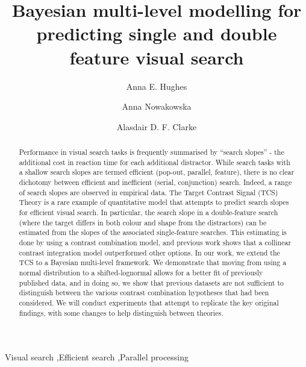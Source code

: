 \documentclass[preprint,12pt,authoryear]{elsarticle}
\begin{document}
\begin{frontmatter}

\title{Bayesian multi-level modelling for predicting single and double feature visual search}

\author[inst1]{Anna E. Hughes}
\author[2]{Anna Nowakowska}
\author[1]{Alasdair D. F. Clarke}

\address[inst1]{Department of Psychology,%
            University of Essex, 
            Colchester,
            CO4 3SQ,
            UK}

\address[2]{School of Psychology,%
            University of Aberdeen, 
            Aberdeen,
            AB24 3FX,            
            UK}

\begin{abstract}
Performance in visual search tasks is frequently summarised by ``search slopes'' - the additional cost in reaction time for each additional distractor. While search tasks with a shallow search slopes are termed efficient (pop-out, parallel, feature), there is no clear dichotomy between efficient and inefficient (serial, conjunction) search. Indeed, a range of search slopes are observed in empirical data. The Target Contrast Signal (TCS) Theory is a rare example of quantitative model that attempts to predict search slopes for efficient visual search. In particular, the search slope in a double-feature search (where the target differs in both colour and shape from the distractors) can be estimated from the slopes of the associated single-feature searches. This estimating is done by using a contrast combination model, and previous work shows that a collinear contrast integration model outperformed other options. In our work, we extend the TCS to a Bayesian multi-level framework. We demonstrate that moving from using a normal distribution to a shifted-lognormal allows for a better fit of previously published data, and in doing so, we show that previous datasets are not sufficient to distinguish between the various contrast combination hypotheses that had been considered. We will conduct experiments that attempt to replicate the key original findings, with some changes to help distinguish between theories. 
\end{abstract}


\begin{keyword}
Visual search \sep  Efficient search \sep Parallel processing
\end{keyword}

\end{frontmatter}
\end{document}
